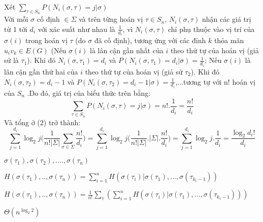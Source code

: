 \documentclass[a4paper]{report}
\begin{document}
Xét $\displaystyle \sum_{\tau \in S_{n}}P(N_{i}(\sigma,\tau)=j | \sigma)$ \\
Với mỗi $\sigma$ cố định $\in \Sigma$ và trên từng hoán vị $\tau \in S_{n}$,  $N_{i}(\sigma,\tau)$ nhận các giá trị từ 1 tới $d_{i}$ với xác suất như nhau là $\frac{1}{d_{i}}$, vì $N_{i}(\sigma,\tau)$ chỉ phụ thuộc vào vị trí của $\sigma(i)$ trong hoán vị $\tau$ (do $\sigma$ đã cố định), tương ứng với các đỉnh $k$ thỏa mãn $u_{i}v_{k} \in E(G)$ (Nếu  $\sigma(i)$ là lân cận gần nhất của $i$ theo thứ tự của hoán vị (giả sử là $\tau_{1}$).  Khi đó $N_{i}(\sigma,\tau_{1}) = d_{i}$ và $P(N_{i}(\sigma,\tau_{1})=d_{i} | \sigma)=\frac{1}{d_{i}}$; Nếu  $\sigma(i)$ là lân cận gần thứ hai của $i$ theo thứ tự của hoán vị (giả sử $\tau_{2}$). Khi đó $N_{i}(\sigma,\tau_{2}) = d_{i}-1$ và $P(N_{i}(\sigma,\tau_{2})=d_{i}-1 | \sigma)=\frac{1}{d_{i}}$,...tương tự với n! hoán vị của $S_{n}$ .Do đó, giá trị của biểu thức trên bằng:
\begin{equation*}
    \displaystyle \sum_{\tau \in S_{n}}P(N_{i}(\sigma,\tau)=j | \sigma)=n!.\frac{1}{d_{i}} = \frac{n!}{d_{i}}
\end{equation*}
Và tổng ở (2) trở thành:
\begin{equation*}
    \displaystyle \sum_{j=1}^{d_{i}}\log_{2}j \Bigg(\frac{1}{n!|\Sigma|}\displaystyle \sum_{\sigma \in \Sigma}\frac{n!}{d_{i}} \Bigg) = \displaystyle \sum_{j=1}^{d_{i}}\log_{2}j \Bigg(\frac{1}{n!|\Sigma|}.|\Sigma|.\frac{n!}{d_{i}} \Bigg) = \displaystyle \sum_{j=1}^{d_{i}}\log_{2}j.\frac{1}{d_{i}} = \frac{\log_{2}d_{i}!}{d_{i}} 
\end{equation*}






$\sigma (\tau_{1}), \sigma (\tau_{2}), .... , \sigma (\tau_{n})$

$H(\sigma (\tau_{1}),..,\sigma (\tau_{n})) = \displaystyle \sum_{i=1}^{n}H(\sigma (\tau_{i})| \sigma (\tau_{1}),...,\sigma (\tau_{k_{i}-1}))$

$H(\sigma (\tau_{1}),..,\sigma (\tau_{n})) = \frac{1}{n!}\displaystyle \sum _{\tau}\left ( \displaystyle \sum_{i=1}^{n}H(\sigma (\tau_{i})| \sigma (\tau_{1}),...,\sigma (\tau_{k_{i}-1})) \right )$

$\Theta(n^{\log_2 2} )$
\end{document}
